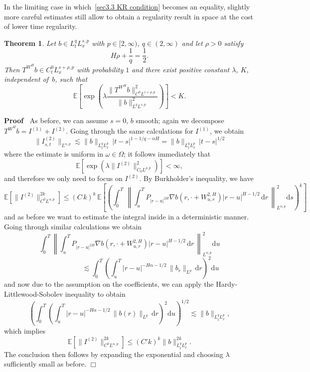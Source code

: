 \documentclass[10pt]{article}
\newcommand{\mathd}{\mathrm{d}}
\newenvironment{proof}{\noindent\textbf{Proof\ }}{\hspace*{\fill}$\Box$\medskip}
\newtheorem{theorem}{Theorem}
\begin{document}
In the limiting case in which~{\eqref{sec3.3 KR condition}} becomes an
equality, slightly more careful estimates still allow to obtain a regularity
result in space at the cost of lower time regularity.

\begin{theorem}
  \label{sec3.3 thm threshold bessel}Let $b \in L^q_t L^{s, p}_x$ with $p \in
  [2, \infty)$, $q \in (2, \infty)$ and let $\rho > 0$ satisfy
  \begin{equation}
    H \rho + \frac{1}{q} = \frac{1}{2} \label{sec3.3 threshold coefficient} .
  \end{equation}
  Then $T^{W^H} b \in C^0_t L_x^{s + \rho, p}$ with probability $1$ and there
  exist positive constant $\lambda$, $K$, independent of~$b$, such that
  \begin{equation}
    \mathbb{E} \left[ \exp \left( \lambda \frac{\| T^{W^H} b \|^2_{C^0 L^{s +
    \rho, p}}}{\| b \|^2_{L^q L^{s, p}}} \right) \right] < K.
  \end{equation}
\end{theorem}

\begin{proof}
  As before, we can assume $s = 0$, $b$ smooth; again we decompose $T^{W^H} b
  = I^{(1)} + I^{(2)}$. Going through the same calculations for $I^{(1)}$, we
  obtain
  \[ \| I_{s, t}^{(2)} \|_{L^{\alpha, p}} \lesssim \| b \|_{L^q_t L^p_x} \, |
     t - s |^{1 - 1 / q - \alpha H} = \| b \|_{L^q_t L^p_x} \, | t - s |^{1 /
     2} \]
  where the estimate is uniform in $\omega \in \Omega$; it follows immediately
  that
  \[ \mathbb{E} [\exp (\lambda \| I^{(2)} \|_{C_0 L^{\rho, p}}^2)] <
     \infty, \]
  and therefore we only need to focus on $I^{(2)}$. By Burkholder's
  inequality, we have
  \begin{equation}
    \mathbb{E} [\| I^{(2)} \|_{C^0 L^{\alpha, p}}^{2 k}] \leqslant \left( C \,
    k \right)^k \, \mathbb{E} \left[ \left( \int_0^T \, \left\| \int_u^T P_{|
    r - u |^{2 H}} \nabla b (r, \cdot + W^{2, H}_{u, r}) | r - u |^{H - 1 / 2}
    \, \mathd r \, \right\|^2_{L^{\alpha, p}} \mathd s \right)^k \right]
  \end{equation}
  and as before we want to estimate the integral inside in a deterministic
  manner. Going through similar calculations we obtain
  \[ \int_0^T \left\| \int_u^T P_{| r - u |^{2 H}} \nabla b (r, \cdot + W^{2,
     H}_{u, r}) | r - u |^{H - 1 / 2} \, \mathd r \, \right\|^2_{L^{\alpha,
     p}} \mathd u \]
  \[ \qquad \qquad \qquad \lesssim \int_0^T \left( \int_u^T | r - u |^{- H
     \alpha - 1 / 2} \, \| b_r \|_{L^p} \, \mathd r \right)^2 \mathd u \]
  and now due to the assumption on the coefficients, we can apply the
  Hardy\mbox{-}Littlewood\mbox{-}Sobolev inequality to obtain
  \[ \left( \int_0^T \left( \int_u^T | r - u |^{- H \alpha - 1 / 2} \, \| b
     (r) \|_{L^p} \, \mathd r \right)^2 \mathd u \right)^{1 / 2} \lesssim
     \| b \|_{L^q_t L^p_x}, \]
  which implies
  \[ \mathbb{E} [\| I^{(2)} \|_{C^0 L^{\alpha, p}}^{2 k}] \leqslant (C' k)^k
     \| b \|^{2 k}_{L^q_t L^p_x} . \]
  The conclusion then follows by expanding the exponential and choosing
  $\lambda$ sufficiently small as before.
\end{proof}
\end{document}
